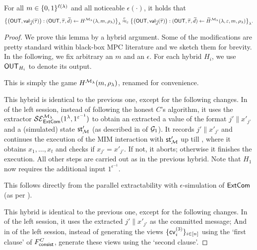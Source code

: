 \begin{lemma}\label{lem:Htil:similarity}
For all $m \in \{0,1\}^{\ell(\lambda)}$ and all noticeable $\epsilon(\cdot)$, it holds that  
    \begin{equation*}
    \big\{\big(\mathsf{OUT}, \mathsf{val}_{\widetilde{d}}(\widetilde{\tau})\big): (\mathsf{OUT}, \widetilde{\tau}, \widetilde{d}) \gets H^{\mathcal{M}_\lambda}(\lambda, m, \rho_\lambda) \big\}_\lambda 
    \stackrel{\text{c}}{\approx}_\varepsilon  
    \big\{\big(\mathsf{OUT}, \mathsf{val}_{\widetilde{d}}(\widetilde{\tau})\big): (\mathsf{OUT}, \widetilde{\tau}, \widetilde{d}) \gets \widetilde{H}^{\mathcal{M}_\lambda}(\lambda, \varepsilon, m, \rho_\lambda) \big\}_\lambda.
    \end{equation*}
\end{lemma}

\begin{proof}
We prove this lemma by a hybrid argument. Some of the modifications are pretty standard within black-box MPC literature and we sketch them for brevity. In the following, we fix arbitrary an $m$ and an $\epsilon$. For each hybrid $H_i$, we use $\mathsf{OUT}_{H_i}$ to denote its output.

 This is simply the game $H^{\mathcal{M}_\lambda}(m,\rho_\lambda)$, renamed for convenience.

 This hybrid is identical to the previous one, except for the following changes. In  of the left session, instead of following the honest $C$'s algorithm, it uses the extractor $\mathcal{SE}_\mathsf{ExtCom}^{\mathcal{M}_\lambda}(1^\lambda,1^{\varepsilon^{-1}})$ to obtain an extracted a value of the format $j'\|x'_{j'}$ and a (simulated) state $\mathsf{st}'_{\mathcal{M}}$ (as described in  of $\mathcal{G}_1$). It records $j'\|x'_{j'}$ and continues the execution of the MIM interaction with $\mathsf{st}'_{\mathcal{M}}$ up till , where it obtains $x_1,\dots,x_t$ and checks if $x_{j'} = x'_{j'}$. If not, it aborts; otherwise it finishes the execution. All other steps are carried out as in the previous hybrid. Note that $H_1$ now requires the additional input $1^{\epsilon^{-1}}$. 

 This follows directly from the parallel extractability with $\epsilon$-simulation of $\mathsf{ExtCom}$ (as per ).

 This hybrid is identical to the previous one, except for the following changes. In  of the left session, it uses the extracted $j'\|x'_{j'}$ as the committed message; And in  of the left session, instead of generating the views $\{\mathsf{cv}^{(3)}_i\}_{i\in [n]}$ using the `first clause' of $F^C_{\mathsf{consist}}$, generate these views using the `second clause'.


\end{proof}
